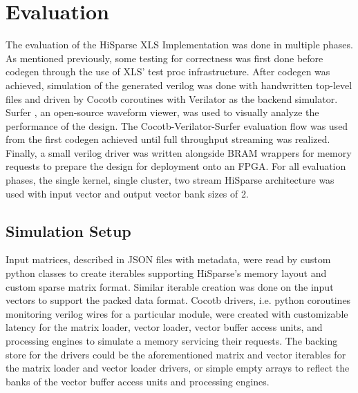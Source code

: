 \chapter{Evaluation}

The evaluation of the HiSparse XLS Implementation was done in multiple phases. As mentioned previously, some testing for correctness was first done before codegen through the use of XLS' test proc infrastructure. After codegen was achieved, simulation of the generated verilog was done with handwritten top-level files and driven by Cocotb \cite{cocotb} coroutines with Verilator \cite{verilator} as the backend simulator. Surfer \cite{surfer}, an open-source waveform viewer, was used to visually analyze the performance of the design. The Cocotb-Verilator-Surfer evaluation flow was used from the first codegen achieved until full throughput streaming was realized. Finally, a small verilog driver was written alongside BRAM wrappers for memory requests to prepare the design for deployment onto an FPGA. For all evaluation phases, the single kernel, single cluster, two stream HiSparse architecture was used with input vector and output vector bank sizes of 2. %

\section{Simulation Setup}




Input matrices, described in JSON files with metadata, were read by custom python classes to create iterables supporting HiSparse's memory layout and custom sparse matrix format. Similar iterable creation was done on the input vectors to support the packed data format. Cocotb drivers, i.e. python coroutines monitoring verilog wires for a particular module, were created with customizable latency for the matrix loader, vector loader, vector buffer access units, and processing engines to simulate a memory servicing their requests. The backing store for the drivers could be the aforementioned matrix and vector iterables for the matrix loader and vector loader drivers, or simple empty arrays to reflect the banks of the vector buffer access units and processing engines. 

